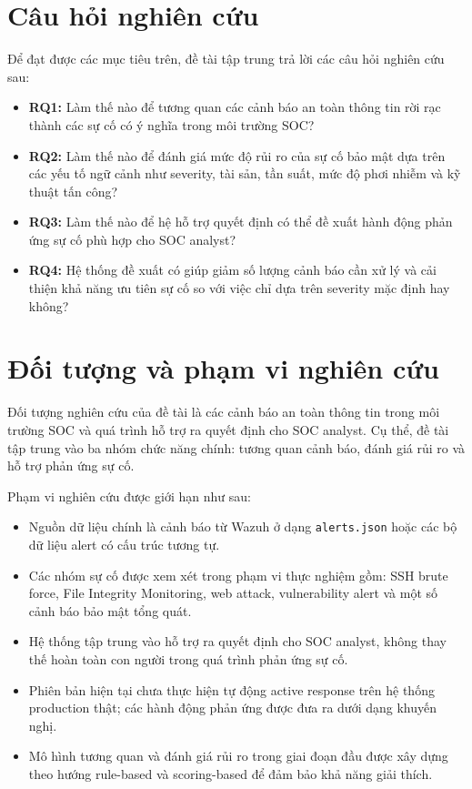 \documentclass[a4paper,12pt,oneside]{book}
\begin{document}
\section{Câu hỏi nghiên cứu}
{\fontsize{13pt}{15.6pt}\selectfont

Để đạt được các mục tiêu trên, đề tài tập trung trả lời các câu hỏi nghiên cứu sau:

\begin{itemize}
    \item \textbf{RQ1:} Làm thế nào để tương quan các cảnh báo an toàn thông tin rời rạc thành các sự cố có ý nghĩa trong môi trường SOC?
    \item \textbf{RQ2:} Làm thế nào để đánh giá mức độ rủi ro của sự cố bảo mật dựa trên các yếu tố ngữ cảnh như severity, tài sản, tần suất, mức độ phơi nhiễm và kỹ thuật tấn công?
    \item \textbf{RQ3:} Làm thế nào để hệ hỗ trợ quyết định có thể đề xuất hành động phản ứng sự cố phù hợp cho SOC analyst?
    \item \textbf{RQ4:} Hệ thống đề xuất có giúp giảm số lượng cảnh báo cần xử lý và cải thiện khả năng ưu tiên sự cố so với việc chỉ dựa trên severity mặc định hay không?
\end{itemize}

}

\section{Đối tượng và phạm vi nghiên cứu}
{\fontsize{13pt}{15.6pt}\selectfont

Đối tượng nghiên cứu của đề tài là các cảnh báo an toàn thông tin trong môi trường SOC và quá trình hỗ trợ ra quyết định cho SOC analyst. Cụ thể, đề tài tập trung vào ba nhóm chức năng chính: tương quan cảnh báo, đánh giá rủi ro và hỗ trợ phản ứng sự cố.

\noindent Phạm vi nghiên cứu được giới hạn như sau:

\begin{itemize}
    \item Nguồn dữ liệu chính là cảnh báo từ Wazuh ở dạng \texttt{alerts.json} hoặc các bộ dữ liệu alert có cấu trúc tương tự.
    \item Các nhóm sự cố được xem xét trong phạm vi thực nghiệm gồm: SSH brute force, File Integrity Monitoring, web attack, vulnerability alert và một số cảnh báo bảo mật tổng quát.
    \item Hệ thống tập trung vào hỗ trợ ra quyết định cho SOC analyst, không thay thế hoàn toàn con người trong quá trình phản ứng sự cố.
    \item Phiên bản hiện tại chưa thực hiện tự động active response trên hệ thống production thật; các hành động phản ứng được đưa ra dưới dạng khuyến nghị.
    \item Mô hình tương quan và đánh giá rủi ro trong giai đoạn đầu được xây dựng theo hướng rule-based và scoring-based để đảm bảo khả năng giải thích.
\end{itemize}

}
\end{document}
